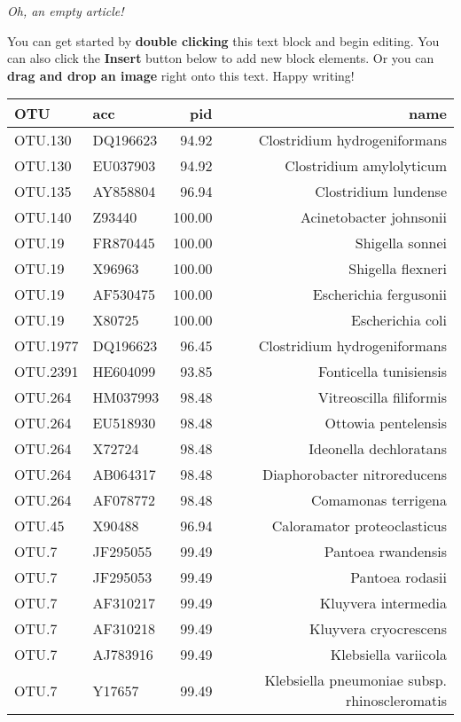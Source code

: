 \textit{Oh, an empty article!} 

You can get started by \textbf{double clicking} this text block and begin editing. You can also click the \textbf{Insert} button below to add new block elements. Or you can \textbf{drag and drop an image} right onto this text. Happy writing!

\begin{tabular}{llrr}
  \hline
OTU & acc & pid & name \\ 
  \hline
OTU.130 & DQ196623 & 94.92 & Clostridium hydrogeniformans \\ 
  OTU.130 & EU037903 & 94.92 & Clostridium amylolyticum \\ 
  OTU.135 & AY858804 & 96.94 & Clostridium lundense \\ 
  OTU.140 & Z93440 & 100.00 & Acinetobacter johnsonii \\ 
  OTU.19 & FR870445 & 100.00 & Shigella sonnei \\ 
  OTU.19 & X96963 & 100.00 & Shigella flexneri \\ 
  OTU.19 & AF530475 & 100.00 & Escherichia fergusonii \\ 
  OTU.19 & X80725 & 100.00 & Escherichia coli \\ 
  OTU.1977 & DQ196623 & 96.45 & Clostridium hydrogeniformans \\ 
  OTU.2391 & HE604099 & 93.85 & Fonticella tunisiensis \\ 
  OTU.264 & HM037993 & 98.48 & Vitreoscilla filiformis \\ 
  OTU.264 & EU518930 & 98.48 & Ottowia pentelensis \\ 
  OTU.264 & X72724 & 98.48 & Ideonella dechloratans \\ 
  OTU.264 & AB064317 & 98.48 & Diaphorobacter nitroreducens \\ 
  OTU.264 & AF078772 & 98.48 & Comamonas terrigena \\ 
  OTU.45 & X90488 & 96.94 & Caloramator proteoclasticus \\ 
  OTU.7 & JF295055 & 99.49 & Pantoea rwandensis \\ 
  OTU.7 & JF295053 & 99.49 & Pantoea rodasii \\ 
  OTU.7 & AF310217 & 99.49 & Kluyvera intermedia \\ 
  OTU.7 & AF310218 & 99.49 & Kluyvera cryocrescens \\ 
  OTU.7 & AJ783916 & 99.49 & Klebsiella variicola \\ 
  OTU.7 & Y17657 & 99.49 & Klebsiella pneumoniae subsp. rhinoscleromatis \\ 

\end{tabular}
